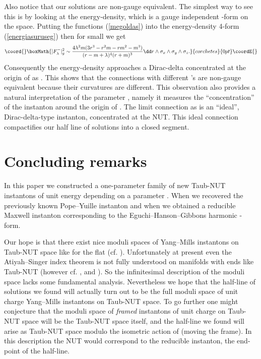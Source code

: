 \documentclass[a4paper,12pt,draft]{article}
\begin{document}
Also notice that our solutions are non-gauge
equivalent. The simplest way to see this is by looking at the
energy-density, which is a gauge independent \coordHE{}-form on the space. 
Putting the functions (\ref{megoldas}) into the
energy-density 4-form (\ref{energiasuruseg}) then for small \myHighlight{$\lambda$}\coordHE{} we
get
\[\coord{}\boxMath{\vert F^-_\lambda\vert^2_g\sim {4\lambda^2m(3r^3-r^2m-rm^2-m^3)\over
(r-m+\lambda )^4(r+m)^3}\dd r\wedge\sigma_x\wedge\sigma_y\wedge\sigma_z.}{corchetes}{0pt}\coordE{}\]
Consequently the energy-density approaches a Dirac-delta 
concentrated at the origin \coordHE{} of \coordHE{} as \coordHE{}. This shows that the connections with different \myHighlight{$\lambda$}\coordHE{}'s are
non-gauge equivalent because their curvatures are different. This
observation also provides a natural interpretation of the parameter
\myHighlight{$\lambda$}\coordHE{}, namely it measures the ``concentration'' of the instanton 
around the origin of \coordHE{}. The limit connection as \coordHE{} is an ``ideal'', Dirac-delta-type instanton, concentrated at the NUT. 
This ideal connection compactifies our half line of solutions into a closed
segment. 

\section{Concluding remarks}

In this paper we constructed a one-parameter family of new Taub-NUT instantons
of unit energy
depending on a parameter \myHighlight{$\lambda\in (0,\infty]$}\coordHE{}. When \coordHE{} we
recovered the previously known Pope--Yuille instanton and when
\myHighlight{$\lambda=\infty$}\coordHE{} we obtained a reducible Maxwell instanton corresponding
to the Eguchi--Hanson--Gibbons \coordHE{} harmonic \coordHE{}-form. 

Our hope is that there exist nice moduli spaces of Yang--Mills instantons
on Taub-NUT
space like for the flat \coordHE{} (cf. \cite{ati-hit-sin}). Unfortunately at
present even the Atiyah--Singer index theorem is not fully understood on
manifolds with ends like Taub-NUT (however cf. \cite{pop},
\cite{nye-sin} and \cite{vai}). So the infinitesimal description of the
moduli space lacks some 
fundamental analysis. Nevertheless we hope that the half-line of solutions we
found will actually turn out to be the full moduli space of unit
charge \coordHE{} Yang--Mills instantons on
Taub-NUT space. To go further one might conjecture that the moduli space
of {\em framed} \coordHE{} instantons of unit charge on Taub-NUT space will
be the Taub-NUT space itself, and the half-line we found will arise as
Taub-NUT space modulo the isometric action of \coordHE{} (moving
the frame). In this description the NUT would correspond to the reducible
instanton, the end-point of the half-line. 
\end{document}
